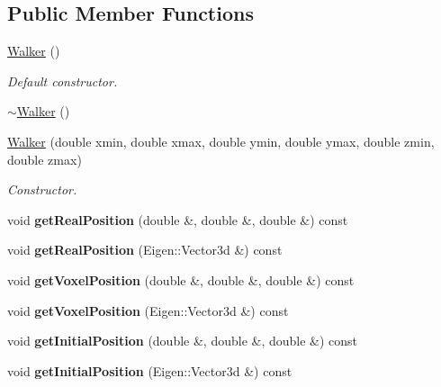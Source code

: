 \subsection*{Public Member Functions}
\begin{DoxyCompactItemize}
\item 
\hyperlink{class_walker_acc0931305bedcf81ff621c31cdf2a92c}{Walker} ()
\begin{DoxyCompactList}\small\item\em Default constructor. \end{DoxyCompactList}\item 
\hyperlink{class_walker_a562c14b600628c18ac689464bd0f7e35}{$\sim$\+Walker} ()
\item 
\hyperlink{class_walker_ada366966172eec6916690c01ac8f01db}{Walker} (double xmin, double xmax, double ymin, double ymax, double zmin, double zmax)
\begin{DoxyCompactList}\small\item\em Constructor. \end{DoxyCompactList}\item 
\mbox{\label{class_walker_a682ea5a26950ba7a563ebbf1d1cfe62e}} 
void {\bfseries get\+Real\+Position} (double \&, double \&, double \&) const
\item 
\mbox{\label{class_walker_a85bf9ae51ffcfa9c797ac863bb0ed58a}} 
void {\bfseries get\+Real\+Position} (Eigen\+::\+Vector3d \&) const
\item 
\mbox{\label{class_walker_a01b46473c4c9126531f86084644be87b}} 
void {\bfseries get\+Voxel\+Position} (double \&, double \&, double \&) const
\item 
\mbox{\label{class_walker_aae6ee54e7ca18144ebc63ae30184ac57}} 
void {\bfseries get\+Voxel\+Position} (Eigen\+::\+Vector3d \&) const
\item 
\mbox{\label{class_walker_a0341476db76d217c0eec89b5f786dc87}} 
void {\bfseries get\+Initial\+Position} (double \&, double \&, double \&) const
\item 
\mbox{\label{class_walker_a3aa5f7410325a5fc1096684e215e4e3f}} 
void {\bfseries get\+Initial\+Position} (Eigen\+::\+Vector3d \&) const
\item 

\end{DoxyCompactItemize}
